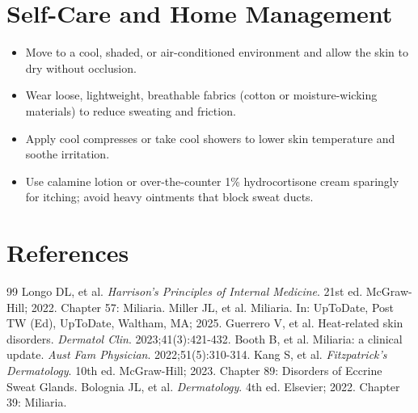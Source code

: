 \section*{Self-Care and Home Management}
\begin{itemize}
  \item Move to a cool, shaded, or air-conditioned environment and allow the skin to dry without occlusion.
  \item Wear loose, lightweight, breathable fabrics (cotton or moisture-wicking materials) to reduce sweating and friction.
  \item Apply cool compresses or take cool showers to lower skin temperature and soothe irritation.
  \item Use calamine lotion or over-the-counter 1\% hydrocortisone cream sparingly for itching; avoid heavy ointments that block sweat ducts.
\end{itemize}

\section*{References}

\begin{thebibliography}{99}
 Longo DL, et al. \emph{Harrison's Principles of Internal Medicine}. 21st ed. McGraw-Hill; 2022. Chapter 57: Miliaria.
 Miller JL, et al. Miliaria. In: UpToDate, Post TW (Ed), UpToDate, Waltham, MA; 2025.
 Guerrero V, et al. Heat-related skin disorders. \emph{Dermatol Clin}. 2023;41(3):421-432.
 Booth B, et al. Miliaria: a clinical update. \emph{Aust Fam Physician}. 2022;51(5):310-314.
 Kang S, et al. \emph{Fitzpatrick's Dermatology}. 10th ed. McGraw-Hill; 2023. Chapter 89: Disorders of Eccrine Sweat Glands.
 Bolognia JL, et al. \emph{Dermatology}. 4th ed. Elsevier; 2022. Chapter 39: Miliaria.
\end{thebibliography}
